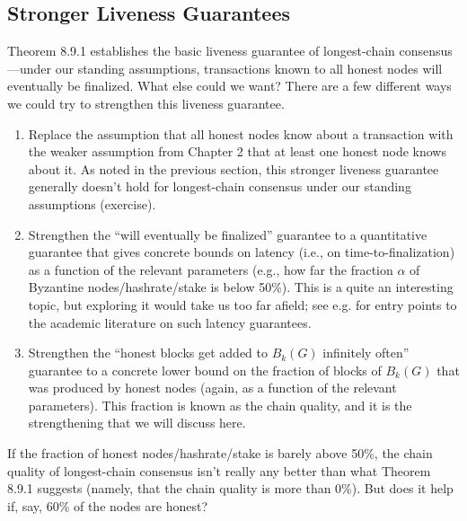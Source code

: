 \subsection{Stronger Liveness Guarantees}
Theorem 8.9.1 establishes the basic liveness guarantee of longest-chain consensus—under
our standing assumptions, transactions known to all honest nodes will eventually be finalized.
What else could we want? There are a few different ways we could try to strengthen this
liveness guarantee.\\
\begin{enumerate}
    \item Replace the assumption that all honest nodes know about a transaction with the
    weaker assumption from Chapter 2 that at least one honest node knows about it. As
    noted in the previous section, this stronger liveness guarantee generally doesn't hold
    for longest-chain consensus under our standing assumptions (exercise).
    \item Strengthen the “will eventually be finalized” guarantee to a quantitative guarantee
    that gives concrete bounds on latency (i.e., on time-to-finalization) as a function of the
    relevant parameters (e.g., how far the fraction $\alpha$ of Byzantine nodes/hashrate/stake is
    below 50\%). This is a quite an interesting topic, but exploring it would take us too far
    afield; see e.g. for entry points to the academic literature on such latency guarantees.
    \item Strengthen the “honest blocks get added to $B_k(G)$ infinitely often” guarantee to a
    concrete lower bound on the fraction of blocks of $B_k(G)$ that was produced by honest
    nodes (again, as a function of the relevant parameters). This fraction is known as the
    chain quality, and it is the strengthening that we will discuss here.
\end{enumerate}

If the fraction of honest nodes/hashrate/stake is barely above 50\%, the chain quality of
longest-chain consensus isn’t really any better than what Theorem 8.9.1 suggests (namely,
that the chain quality is more than 0\%). But does it help if, say, 60\% of the nodes are
honest?
